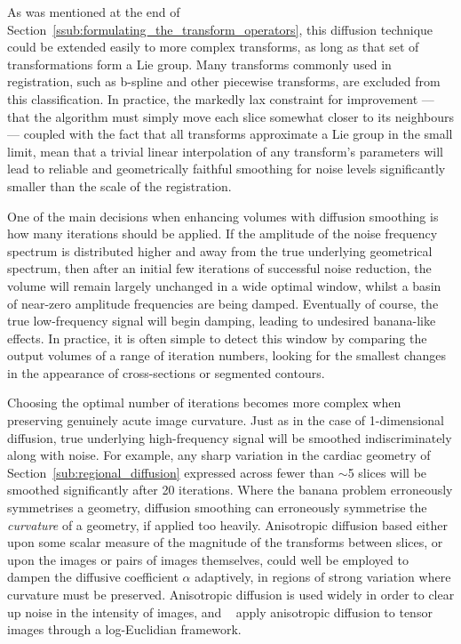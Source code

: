   As was mentioned at the end of Section~\ref{ssub:formulating_the_transform_operators}, this diffusion technique could be extended easily to more complex transforms, as long as that set of transformations form a Lie group. Many transforms commonly used in registration, such as b-spline and other piecewise transforms, are excluded from this classification. In practice, the markedly lax constraint for improvement --- that the algorithm must simply  move each slice somewhat closer to its neighbours --- coupled with the fact that all transforms approximate a Lie group in the small limit, mean that a trivial linear interpolation of any transform's parameters will lead to reliable and geometrically faithful smoothing for noise levels significantly smaller than the scale of the registration.
    
  One of the main decisions when enhancing volumes with diffusion smoothing is how many iterations should be applied. If the amplitude of the noise frequency spectrum is distributed higher and away from the true underlying geometrical spectrum, then after an initial few iterations of successful noise reduction, the volume will remain largely unchanged in a wide optimal window, whilst a basin of near-zero amplitude frequencies are being damped. Eventually of course, the true low-frequency signal will begin damping, leading to undesired banana-like effects. In practice, it is often simple to detect this window by comparing the output volumes of a range of iteration numbers, looking for the smallest changes in the appearance of cross-sections or segmented contours.
  
  Choosing the optimal number of iterations becomes more complex when preserving genuinely acute image curvature. Just as in the case of 1-dimensional diffusion, true underlying high-frequency signal will be smoothed indiscriminately along with noise. For example, any sharp variation in the cardiac geometry of Section~\ref{sub:regional_diffusion} expressed across fewer than $\sim$5 slices will be smoothed significantly after 20 iterations. Where the banana problem erroneously symmetrises a geometry, diffusion smoothing can erroneously symmetrise the \emph{curvature} of a geometry, if applied too heavily. Anisotropic diffusion based either upon some scalar measure of the magnitude of the transforms between slices, or upon the images or pairs of images themselves, could well be employed to dampen the diffusive coefficient $\alpha$ adaptively, in regions of strong variation where curvature must be preserved. Anisotropic diffusion is used widely in order to clear up noise in the intensity of images, and ~\cite{Arsigny2005} apply anisotropic diffusion to tensor images through a log-Euclidian framework.
  
